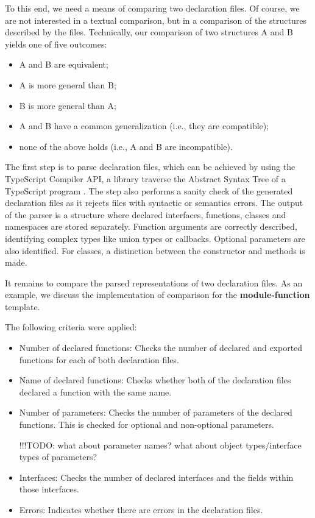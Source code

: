 \documentclass[a4paper,english,cleveref, autoref]{lipics-v2019}
\begin{document}
To this end, we need a means of comparing two declaration files. Of
course, we are not interested in a textual comparison, but in a
comparison of the structures described by the files. Technically, our
comparison of two structures A and B yields one of five outcomes:
\begin{itemize}
\item A and B are equivalent;
\item A is more general than B;
\item B is more general than A;
\item A and B have a common generalization (i.e., they are
  compatible);
\item none of the above holds (i.e., A and B are incompatible).
\end{itemize}

The first step is to parse declaration files, which can be
achieved by using the TypeScript Compiler API, a library traverse the
Abstract Syntax Tree of a TypeScript program
\cite{typescript-compiler-api}. 
The step also performs a sanity check of the generated declaration
files as it rejects files with syntactic or semantics errors.
The output of the parser is a structure where declared
{interfaces}, {functions}, {classes} and
{namespaces} are stored separately. Function arguments are
correctly described, identifying complex types like union types or
callbacks. Optional parameters are also identified. For
{classes}, a distinction between the constructor and methods
is made. 


It remains to compare the parsed representations of two declaration
files.
As an example, we discuss the implementation of comparison for
the \textbf{module-function} template.

The following criteria were applied:
\begin{itemize}
\item Number of declared functions: Checks the number of declared
  and exported functions for each of both declaration files. 
\item Name of declared functions: Checks whether both of the
  declaration files declared a function with the same name. 
\item Number of parameters: Checks the number of parameters of the
  declared functions. This is checked for optional and non-optional
  parameters.
  
  !!!TODO: what about parameter names? what about object
  types/interface types of parameters?
\item Interfaces: Checks the number of declared interfaces and the
  fields within those interfaces. 
\item Errors: Indicates whether there are errors in the declaration files.
\end{itemize}
\end{document}
